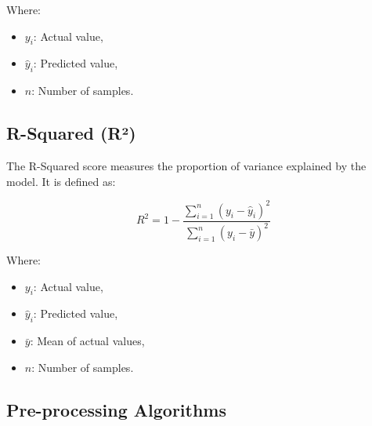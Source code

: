 \documentclass{article}
\begin{document}
Where:
\begin{itemize}
    \item \( y_i \): Actual value,
    \item \( \hat{y}_i \): Predicted value,
    \item \( n \): Number of samples.
\end{itemize}

\subsection*{R-Squared (R²)}

The R-Squared score measures the proportion of variance explained by the model. It is defined as:

\[
R^2 = 1 - \frac{\sum_{i=1}^n (y_i - \hat{y}_i)^2}{\sum_{i=1}^n (y_i - \bar{y})^2}
\]

Where:
\begin{itemize}
    \item \( y_i \): Actual value,
    \item \( \hat{y}_i \): Predicted value,
    \item \( \bar{y} \): Mean of actual values,
    \item \( n \): Number of samples.
\end{itemize}

\subsection{Pre-processing Algorithms}
\end{document}
